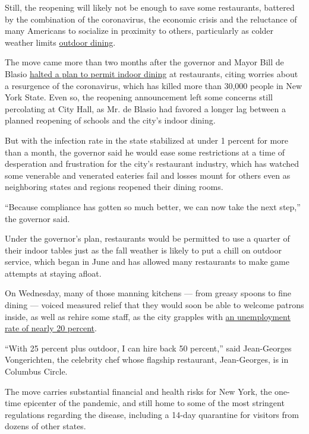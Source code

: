 Still, the reopening will likely not be enough to save some restaurants,
battered by the combination of the coronavirus, the economic crisis and
the reluctance of many Americans to socialize in proximity to others,
particularly as colder weather limits
\href{https://www.nytimes3xbfgragh.onion/2020/09/10/nyregion/nyc-outdoor-dining-homeless.html}{outdoor
dining}.

The move came more than two months after the governor and Mayor Bill de
Blasio
\href{https://www.nytimes3xbfgragh.onion/2020/07/01/nyregion/indoor-dining-coronavirus-nyc.html}{halted
a plan to permit indoor dining} at restaurants, citing worries about a
resurgence of the coronavirus, which has killed more than 30,000 people
in New York State. Even so, the reopening announcement left some
concerns still percolating at City Hall, as Mr. de Blasio had favored a
longer lag between a planned reopening of schools and the city's indoor
dining.

But with the infection rate in the state stabilized at under 1 percent
for more than a month, the governor said he would ease some restrictions
at a time of desperation and frustration for the city's restaurant
industry, which has watched some venerable and venerated eateries fail
and losses mount for others even as neighboring states and regions
reopened their dining rooms.

``Because compliance has gotten so much better, we can now take the next
step,'' the governor said.

Under the governor's plan, restaurants would be permitted to use a
quarter of their indoor tables just as the fall weather is likely to put
a chill on outdoor service, which began in June and has allowed many
restaurants to make game attempts at staying afloat.

On Wednesday, many of those manning kitchens --- from greasy spoons to
fine dining --- voiced measured relief that they would soon be able to
welcome patrons inside, as well as rehire some staff, as the city
grapples with
\href{https://labor.ny.gov/stats/pressreleases/pruistat.shtm}{an
unemployment rate of nearly 20 percent}.

``With 25 percent plus outdoor, I can hire back 50 percent,'' said
Jean-Georges Vongerichten, the celebrity chef whose flagship restaurant,
Jean-Georges, is in Columbus Circle.

The move carries substantial financial and health risks for New York,
the one-time epicenter of the pandemic, and still home to some of the
most stringent regulations regarding the disease, including a 14-day
quarantine for visitors from dozens of other states.

